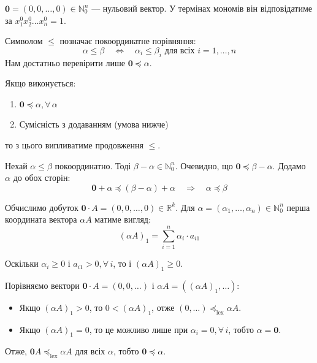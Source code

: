 $\mathbf{0} = (0, 0, \ldots, 0) \in \mathbb{N}_0^n$ --- нульовий вектор. У термінах мономів він відповідатиме за 
$x_1^0 x_2^0 \ldots x_n^0 = 1$.

Символом $\leq$ позначає покоординатне порівняння:
\begin{equation*}
    \alpha \leq \beta \quad \Leftrightarrow \quad \alpha_i \leq \beta_i \text{ для всіх } i = 1, \ldots, n
\end{equation*}
Нам достатньо перевірити лише $\mathbf{0} \preceq \alpha$.

\noindent Якщо виконується:
\begin{enumerate}
    \item $\mathbf{0} \preceq \alpha, \forall \, \alpha$
    \item Сумісність з додаванням (умова  нижче)
\end{enumerate}
то з цього випливатиме продовження $\leq$.

\noindent Нехай $\alpha \leq \beta$ покоординатно. Тоді $\beta - \alpha \in \mathbb{N}_0^n$. Очевидно, що 
$\mathbf{0} \preceq \beta - \alpha$. Додамо $\alpha$ до обох сторін:
\begin{equation*}
    \mathbf{0} + \alpha \preceq (\beta - \alpha) + \alpha \quad \Rightarrow \quad \alpha \preceq \beta
\end{equation*}

\noindent Обчислимо добуток $\mathbf{0} \cdot A = (0, 0, \ldots, 0) \in \mathbb{R}^k$. Для $\alpha = (\alpha_1, \ldots, \alpha_n) \in \mathbb{N}_0^n$ 
перша координата вектора $\alpha A$ матиме вигляд:
\begin{equation*}
    (\alpha A)_1 = \sum_{i=1}^{n} \alpha_i \cdot a_{i1}
\end{equation*}

Оскільки $\alpha_i \geq 0 \text{ і } a_{i1} > 0, \forall \, i$, то і $(\alpha A)_1 \geq 0$.

Порівняємо вектори $\mathbf{0} \cdot A = (0, 0, \ldots)$ і $\alpha A = ((\alpha A)_1, \ldots)$:
\begin{itemize}
    \item Якщо $(\alpha A)_1 > 0$, то $0 < (\alpha A)_1$, отже $(0, \ldots) \preceq_{\text{lex}} \alpha A$.
    \item Якщо $(\alpha A)_1 = 0$, то це можливо лише при $\alpha_i = 0, \forall \, i$, тобто $\alpha = \mathbf{0}$.
\end{itemize}

Отже, $\mathbf{0} A \preceq_{\text{lex}} \alpha A$ для всіх $\alpha$, тобто $\mathbf{0} \preceq \alpha$.


